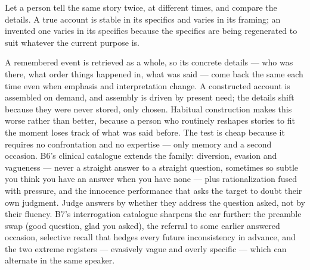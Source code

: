


\begin{core}
Let a person tell the same story twice, at different times, and compare the details. A true account is stable in its specifics and varies in its framing; an invented one varies in its specifics because the specifics are being regenerated to suit whatever the current purpose is.
\end{core}

\begin{mechanism}
A remembered event is retrieved as a whole, so its concrete details --- who was there, what order things happened in, what was said --- come back the same each time even when emphasis and interpretation change. A constructed account is assembled on demand, and assembly is driven by present need; the details shift because they were never stored, only chosen. Habitual construction makes this worse rather than better, because a person who routinely reshapes stories to fit the moment loses track of what was said before. The test is cheap because it requires no confrontation and no expertise --- only memory and a second occasion. B6's clinical catalogue extends the family: diversion, evasion and vagueness --- never a straight answer to a straight question, sometimes so subtle you think you have an answer when you have none --- plus rationalization fused with pressure, and the innocence performance that asks the target to doubt their own judgment. Judge answers by whether they address the question asked, not by their fluency. B7's interrogation catalogue sharpens the ear further: the preamble swap (good question, glad you asked), the referral to some earlier answered occasion, selective recall that hedges every future inconsistency in advance, and the two extreme registers --- evasively vague and overly specific --- which can alternate in the same speaker.
\end{mechanism}

